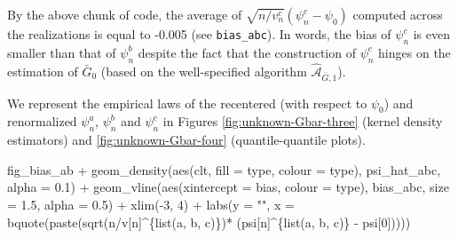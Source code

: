 \documentclass[
  11pt,
  openright,twoside]{book}
\newenvironment{Shaded}{\begin{snugshade}}{\end{snugshade}}
\newcommand{\AttributeTok}[1]{\textcolor[rgb]{0.77,0.63,0.00}{#1}}
\newcommand{\DecValTok}[1]{\textcolor[rgb]{0.00,0.00,0.81}{#1}}
\newcommand{\FloatTok}[1]{\textcolor[rgb]{0.00,0.00,0.81}{#1}}
\newcommand{\FunctionTok}[1]{\textcolor[rgb]{0.00,0.00,0.00}{#1}}
\newcommand{\NormalTok}[1]{#1}
\newcommand{\SpecialCharTok}[1]{\textcolor[rgb]{0.00,0.00,0.00}{#1}}
\newcommand{\StringTok}[1]{\textcolor[rgb]{0.31,0.60,0.02}{#1}}
\newcommand{\Algo}{\widehat{\mathcal{A}}}
\newcommand{\Gbar}{\bar{G}}
\theoremstyle{definition}
\theoremstyle{definition}
\theoremstyle{definition}
\theoremstyle{definition}
\theoremstyle{remark}
\begin{document}
By the above chunk of code, the average of \(\sqrt{n/v_{n}^{c}} (\psi_{n}^{c} - \psi_{0})\) computed across the realizations is equal to
-0.005 (see \texttt{bias\_abc}). In words, the
bias of \(\psi_{n}^{c}\) is even smaller than that of \(\psi_{n}^{b}\) despite the
fact that the construction of \(\psi_{n}^{c}\) hinges on the estimation of
\(\Gbar_{0}\) (based on the well-specified algorithm \(\Algo_{\Gbar,1}\)).

We represent the empirical laws of the recentered (with respect to \(\psi_{0}\))
and renormalized \(\psi_{n}^{a}\), \(\psi_{n}^{b}\) and \(\psi_{n}^{c}\) in Figures
\ref{fig:unknown-Gbar-three} (kernel density estimators) and
\ref{fig:unknown-Gbar-four} (quantile-quantile plots).



\begin{Shaded}
\begin{Highlighting}[]
\NormalTok{fig\_bias\_ab }\SpecialCharTok{+}
  \FunctionTok{geom\_density}\NormalTok{(}\FunctionTok{aes}\NormalTok{(clt, }\AttributeTok{fill =}\NormalTok{ type, }\AttributeTok{colour =}\NormalTok{ type), psi\_hat\_abc, }\AttributeTok{alpha =} \FloatTok{0.1}\NormalTok{) }\SpecialCharTok{+}
  \FunctionTok{geom\_vline}\NormalTok{(}\FunctionTok{aes}\NormalTok{(}\AttributeTok{xintercept =}\NormalTok{ bias, }\AttributeTok{colour =}\NormalTok{ type),}
\NormalTok{             bias\_abc, }\AttributeTok{size =} \FloatTok{1.5}\NormalTok{, }\AttributeTok{alpha =} \FloatTok{0.5}\NormalTok{) }\SpecialCharTok{+}
  \FunctionTok{xlim}\NormalTok{(}\SpecialCharTok{{-}}\DecValTok{3}\NormalTok{, }\DecValTok{4}\NormalTok{) }\SpecialCharTok{+} 
  \FunctionTok{labs}\NormalTok{(}\AttributeTok{y =} \StringTok{""}\NormalTok{,}
       \AttributeTok{x =} \FunctionTok{bquote}\NormalTok{(}\FunctionTok{paste}\NormalTok{(}\FunctionTok{sqrt}\NormalTok{(n}\SpecialCharTok{/}\NormalTok{v[n]}\SpecialCharTok{\^{}}\NormalTok{\{}\FunctionTok{list}\NormalTok{(a, b, c)\})}\SpecialCharTok{*}
\NormalTok{                        (psi[n]}\SpecialCharTok{\^{}}\NormalTok{\{}\FunctionTok{list}\NormalTok{(a, b, c)\} }\SpecialCharTok{{-}}\NormalTok{ psi[}\DecValTok{0}\NormalTok{]))))}
\end{Highlighting}
\end{Shaded}
\end{document}
